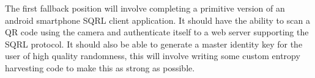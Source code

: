 The first fallback position will involve completing a primitive version of an android smartphone SQRL client application. It should have the ability to scan a QR code using the camera and authenticate itself to a web server supporting the SQRL protocol. It should also be able to generate a master identity key for the user of high quality randomness, this will involve writing some custom entropy harvesting code to make this as strong as possible.
